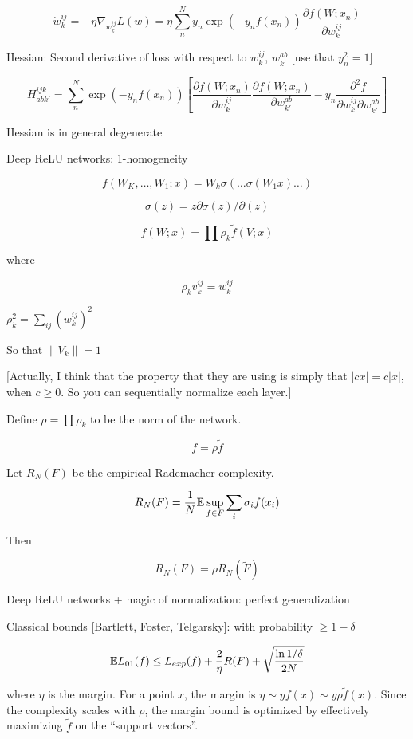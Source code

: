 \documentclass[english]{article}
\begin{document}
$$
\dot w_k^{ij} 
= 
-\eta \nabla_{w_k^{ij}} L(w)
=
\eta
\sum_n^N y_n\exp(-y_n f(x_n))
\frac{\partial f(W;x_n)}{\partial w_k^{ij}}
$$

Hessian: Second derivative of loss with respect to $w_k^{ij}$, $w_{k'}^{ab}$  [use that $y_n^2=1$]

$$
H_{abk'}^{ijk}
= 
\sum_n^N \exp(-y_n f(x_n))
[
\frac{\partial f(W;x_n)}{\partial w_k^{ij}}
\frac{\partial f(W;x_n)}{\partial w_{k'}^{ab}}
-
y_n\frac{\partial^2f}{\partial w_k^{ij}\partial w_{k'}^{ab}}
]
$$

Hessian is in general degenerate

\item Deep ReLU networks: 1-homogeneity

$$f(W_K,\ldots, W_1; x) = W_k \sigma(\ldots \sigma (W_1x)\ldots)$$

$$\sigma(z) = z \partial \sigma(z)/\partial(z)$$

$$f(W;x) = \prod \rho_k \tilde f(V;x)$$

where 

$$\rho_k v_k^{ij} = w_k^{ij}$$

$\rho_k^2 = \sum_{ij} (w_k^{ij})^2$

So that $\|V_k\|=1$%

[Actually, I think that the property that they are using is simply that $|cx|=c|x|$, when $c\ge 0$. So you can sequentially normalize each layer.]

Define $\rho = \prod \rho_k$ to be the norm of the network.

$$f = \rho \tilde f$$

Let $R_N(F)$ be the empirical Rademacher complexity. 

$$R_N(F) = \frac1N \mathbb{E} \sup_{f\in F} \sum_i \sigma_if(x_i)$$

Then

$$R_N(F) = \rho R_N(\tilde F)$$


\item Deep ReLU networks + magic of normalization: perfect generalization

Classical bounds [Bartlett, Foster, Telgarsky]: with probability $\ge 1-\delta$

$$\mathbb{E} L_{01}(f) \le L_{exp}(f)
+ 
\frac2\eta R(F)
+ 
\sqrt{\frac{\ln 1/\delta}{2N}}
$$

where $\eta$ is the margin. For a point $x$, the margin is $\eta \sim yf(x)  \sim y \rho \tilde f(x)$. Since the complexity scales with $\rho$, the margin bound is optimized by effectively maximizing $\tilde f$
on the “support vectors”.
\end{document}
